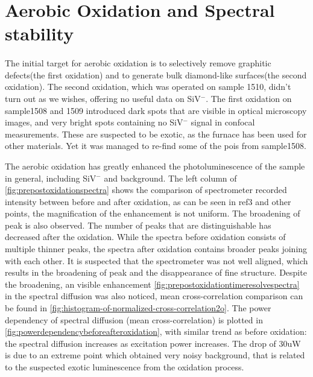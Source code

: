 \section{Aerobic Oxidation and Spectral stability}

\paragraph{}The initial target for aerobic oxidation is to selectively remove graphitic defects(the first oxidation) and to generate bulk diamond-like surfaces(the second oxidation). The second oxidation, which was operated on sample 1510, didn't turn out as we wishes, offering no useful data on SiV$^{-}$. The first oxidation on sample1508 and 1509 introduced dark spots that are visible in optical microscopy images, and very bright spots containing no SiV$^{-}$ signal in confocal measurements. These are suspected to be exotic, as the furnace has been used for other materials. Yet it was managed to re-find some of the pois from sample1508.

The aerobic oxidation has greatly enhanced the photoluminescence of the sample in general, including SiV$^{-}$ and background. The left column of \ref{fig:prepostoxidationspectra} shows the comparison of spectrometer recorded intensity between before and after oxidation, as can be seen in ref3 and other points, the magnification of the enhancement is not uniform. The broadening of peak is also observed. The number of peaks that are distinguishable has decreased after the oxidation. While the spectra before oxidation consists of multiple thinner peaks, the spectra after oxidation contains broader peaks joining with each other. It is suspected that the spectrometer was not well aligned, which results in the broadening of peak  and the disappearance of fine structure. Despite the broadening, an visible enhancement \ref{fig:prepostoxidationtimeresolvespectra} in the spectral diffusion was also noticed, mean cross-correlation comparison can be found in \ref{fig:histogram-of-normalized-cross-correlation2o}. The power dependency of spectral diffusion (mean cross-correlation) is plotted in \ref{fig:powerdependencybeforeafteroxidation}, with similar trend as before oxidation: the spectral diffusion increases as excitation power increases. The drop of 30uW is due to an extreme point which obtained very noisy background, that is related to the suspected exotic luminescence from the oxidation process. 

